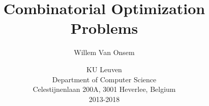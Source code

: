 \documentclass{../SharedData/dictionaryclass}
\title{Combinatorial Optimization Problems}
\author{Willem Van Onsem}
\date{KU Leuven\\Department of Computer Science\\Celestijnenlaan 200A, 3001 Heverlee, Belgium\\2013-2018}
\begin{document}
\glsaddall
\printglossaries
\end{document}

